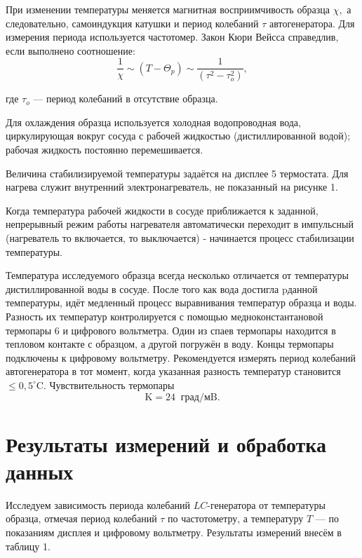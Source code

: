 \documentclass[a4paper]{article}
\theoremstyle{definition}
\theoremstyle{remark}
\begin{document}
\noindent При изменении температуры меняется магнитная восприимчивость образца $\chi,$ а следовательно, самоиндукция катушки и период колебаний $\tau$ автогенератора. Для измерения периода используется частотомер.
Закон Кюри Вейсса справедлив, если выполнено соотношение: 
\begin{equation*}
\frac{1}{\chi} \sim\left(T-\Theta_{p}\right) \sim \frac{1}{\left(\tau^{2}-\tau_{o}^{2}\right)},
\end{equation*}

где $\tau_{o}$ --- период колебаний в отсутствие образца. \medskip

\noindent Для охлаждения образца используется холодная водопроводная вода, циркулирующая вокруг сосуда с рабочей жидкостью (дистиллированной водой); рабочая жидкость постоянно перемешивается. \medskip

\noindent Величина стабилизируемой температуры задаётся на дисплее 5 термостата. Для нагрева служит внутренний электронагреватель, не показанный на рисунке 1.

\noindent Когда температура рабочей жидкости в сосуде приближается к заданной, непрерывный режим работы нагревателя автоматически переходит в импульсный (нагреватель то включается, то выключается) - начинается процесс стабилизации температуры. \medskip

\noindent Температура исследуемого образца всегда несколько отличается от температуры дистиллированной воды в сосуде. После того как вода достигла pданной температуры, идёт медленный процесс выравнивания температур образца и воды. Разность их температур контролируется с помощью медноконстантановой термопары 6 и цифрового вольтметра. Один из спаев термопары находится в тепловом контакте с образцом, а другой погружён в воду. Концы термопары подключены к цифровому вольтметру. Рекомендуется измерять период колебаний автогенератора в тот момент, когда указанная разность температур становится $\leqslant 0,5^{\circ} \mathrm{C} .$ Чувствительность термопары $$\mathrm{K}=24 \;\;\text{град} / \mathrm{\text{мB}}.$$

\section{Результаты измерений и обработка данных}

Исследуем зависимость периода колебаний $LC$-генератора от температуры образца, отмечая период колебаний $\tau$ по частотометру, а температуру $T$ --- по показаниям дисплея и цифровому вольтметру. Результаты измерений внесём в таблицу 1.
\end{document}
